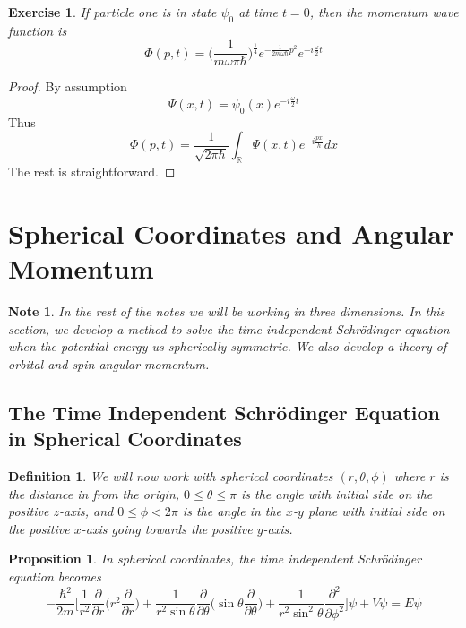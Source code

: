 \documentclass[12pt]{amsart}
\newtheorem{prop}[thm]{Proposition}
\newtheorem{defn}[thm]{Definition}
\newtheorem{note}[thm]{Note}
\newtheorem{ex}[thm]{Exercise}
\newcommand{\sch}{Schr\"{o}dinger }
\newcommand{\om}{\omega}
\newcommand{\R}{\mathbb{R}}
\newcommand{\p}[1]{\frac{\partial}{\partial{#1}}}
\begin{document}
\begin{ex}
If particle one is in state $\psi_0$ at time $t=0$, then the momentum wave function is $$\Phi(p,t) = \bigg(\frac{1}{m \om \pi \hbar}\bigg)^{\frac{1}{4}}e^{-\frac{1}{2m \om \hbar}p^2}e^{-i \frac{\om}{2}t}$$
\end{ex}

\begin{proof}
By assumption $$\Psi(x,t) = \psi_0(x)e^{-i \frac{\om}{2}t}$$ Thus $$\Phi(p,t) = \frac{1}{\sqrt{2 \pi \hbar}}\int_{\R}\Psi(x,t)e^{-i\frac{px}{h}}dx$$
The rest is straightforward.
\end{proof}
\newpage

\section{Spherical Coordinates and Angular Momentum}
\begin{note}
In the rest of the notes we will be working in three dimensions. In this section, we develop a method to solve the time independent \sch equation when the potential energy us spherically symmetric. We also develop a theory of orbital and spin angular momentum. 
\end{note}


\subsection{The Time Independent \sch Equation in Spherical Coordinates}
\begin{defn}
We will now work with spherical coordinates $(r, \theta, \phi)$ where $r$ is the distance in from the origin, $0 \leq \theta \leq \pi$ is the angle with initial side on the positive $z$-axis, and $0 \leq \phi < 2\pi$ is the angle in the $x$-$y$ plane with initial side on the positive $x$-axis going towards the positive $y$-axis.
\end{defn}

\begin{prop}
In spherical coordinates, the time independent \sch equation becomes $$-\frac{\hbar^2}{2m}\bigg[ \frac{1}{r^2} \p{r}\bigg( r^2 \p{r}\bigg) + \frac{1}{r^2 \sin \theta} \p{\theta} \bigg( \sin \theta \p{\theta}\bigg) + \frac{1}{r^2 \sin^2 \theta} \frac{\partial^2}{\partial \phi^2}  \bigg] \psi + V \psi = E \psi$$
\end{prop}
\end{document}
